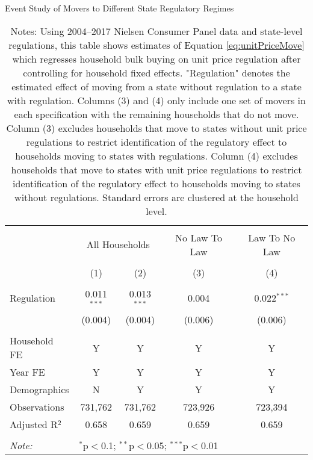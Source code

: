 \begin{table}[!htbp] \centering
  \caption{Event Study of Movers to Different State Regulatory Regimes}
  \label{tab:unitPriceLawMovers}
\begin{tabular}{@{\extracolsep{5pt}}lcccc}
\\[-1.8ex]\hline
\hline \\[-1.8ex]
 & \multicolumn{2}{c}{All Households} & No Law To Law & Law To No Law \\
\\[-1.8ex] & (1) & (2) & (3) & (4)\\
\hline \\[-1.8ex]
 Regulation & 0.011$^{***}$ & 0.013$^{***}$ & 0.004 & 0.022$^{***}$ \\
  & (0.004) & (0.004) & (0.006) & (0.006) \\
 \hline \\[-1.8ex]
Household FE & Y & Y & Y & Y \\
Year FE & Y & Y & Y & Y \\
Demographics & N & Y & Y & Y \\
Observations & 731,762 & 731,762 & 723,926 & 723,394 \\
Adjusted R$^{2}$ & 0.658 & 0.659 & 0.659 & 0.659 \\
\hline
\hline \\[-1.8ex]
\textit{Note:}  & \multicolumn{4}{l}{$^{*}$p$<$0.1; $^{**}$p$<$0.05; $^{***}$p$<$0.01} \\
\end{tabular}
\caption*{Notes: Using 2004--2017 Nielsen Consumer Panel data and state-level regulations, this table shows estimates of Equation \ref{eq:unitPriceMove} which regresses household bulk buying on unit price regulation after controlling for household fixed effects. "Regulation" denotes the estimated effect of moving from a state without regulation to a state with regulation. Columns (3) and (4) only include one set of movers in each specification with the remaining households that do not move. Column (3) excludes households that move to states without unit price regulations to restrict identification of the regulatory effect to households moving to states with regulations. Column (4) excludes households that move to states with unit price regulations to restrict identification of the regulatory effect to households moving to states without regulations. Standard errors are clustered at the household level.}
\end{table}

